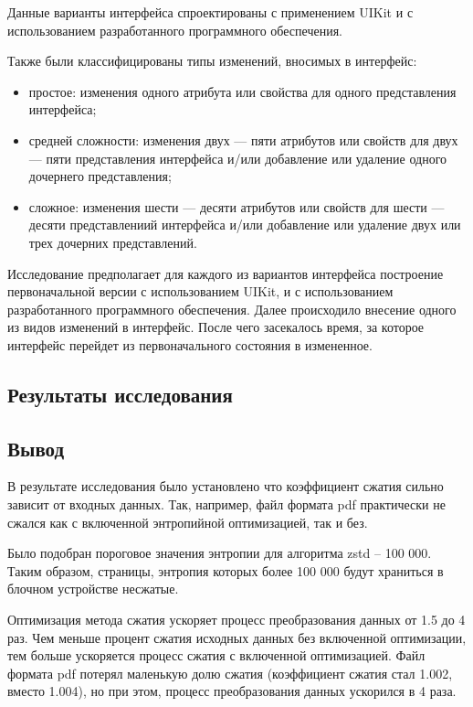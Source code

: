 Данные варианты интерфейса спроектированы с применением UIKit и с использованием разработанного программного обеспечения.

Также были классифицированы типы изменений, вносимых в интерфейс:
\begin{itemize}[label=---]
	\item простое: изменения одного атрибута или свойства для одного представления интерфейса;
	\item средней сложности: изменения двух --- пяти атрибутов или свойств для двух --- пяти представления интерфейса и/или добавление или удаление одного дочернего представления;
	\item сложное: изменения шести --- десяти атрибутов или свойств для шести --- десяти представлениий интерфейса и/или добавление или удаление двух или трех дочерних представлений.
\end{itemize}		

Исследование предполагает для каждого из вариантов интерфейса построение первоначальной версии с использованием UIKit, и с использованием разработанного программного обеспечения.
Далее происходило внесение одного из видов изменений в интерфейс.
После чего засекалось время, за которое интерфейс перейдет из первоначального состояния в измененное. 

\subsection{Результаты исследования}

\subsection*{Вывод}

В результате исследования было установлено что коэффициент сжатия сильно зависит от входных данных. Так, например, файл формата pdf практически не сжался как с включенной энтропийной оптимизацией, так и без.

Было подобран пороговое значения энтропии для алгоритма zstd -- 100 000. Таким образом, страницы, энтропия которых более 100 000 будут храниться в блочном устройстве несжатые. 

Оптимизация метода сжатия ускоряет процесс преобразования данных от 1.5 до 4 раз. Чем меньше процент сжатия исходных данных без включенной оптимизации, тем больше ускоряется процесс сжатия с включенной оптимизацией. Файл формата pdf потерял маленькую долю сжатия (коэффициент сжатия стал 1.002, вместо 1.004), но при этом, процесс преобразования данных ускорился в 4 раза.

